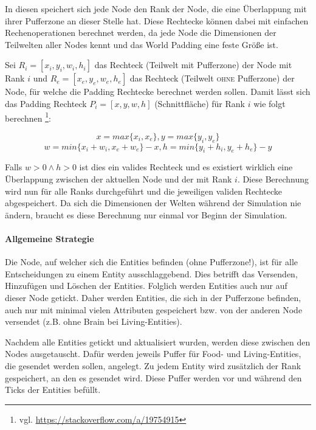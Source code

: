 \documentclass[course=erap]{aspdoc}
\begin{document}
In diesen speichert sich jede Node den Rank der Node, die eine Überlappung mit ihrer Pufferzone an dieser Stelle hat. Diese Rechtecke können dabei mit einfachen Rechenoperationen berechnet werden, da jede Node die Dimensionen der Teilwelten aller Nodes kennt und das World Padding eine feste Größe ist.

Sei \(R_i = [x_i, y_i, w_i, h_i]\) das Rechteck (Teilwelt mit Pufferzone) der Node mit Rank \(i\) und \(R_e = [x_e, y_e, w_e, h_e]\) das Rechteck (Teilwelt \textsc{ohne} Pufferzone) der Node, für welche die Padding Rechtecke berechnet werden sollen. Damit lässt sich das Padding Rechteck \(P_i = [x, y, w, h]\) (Schnittfläche) für Rank \(i\) wie folgt berechnen \footnote{vgl. \href{https://stackoverflow.com/a/19754915}{https://stackoverflow.com/a/19754915}}:

\[x = max\{x_i, x_e\}, y = max\{y_i, y_e\}\]
\[w = min\{x_i + w_i, x_e + w_e\} - x, h = min\{y_i + h_i, y_e + h_e\} - y\]

Falls \(w > 0 \land h > 0\) ist dies ein valides Rechteck und es existiert wirklich eine Überlappung zwischen der aktuellen Node und der mit Rank \(i\). Diese Berechnung wird nun für alle Ranks durchgeführt und die jeweiligen validen Rechtecke abgespeichert. Da sich die Dimensionen der Welten während der Simulation nie ändern, braucht es diese Berechnung nur einmal vor Beginn der Simulation.


\paragraph{Allgemeine Strategie}
\label{par:allgemeine-strategie}
Die Node, auf welcher sich die Entities befinden (ohne Pufferzone!), ist für alle Entscheidungen zu einem Entity ausschlaggebend. Dies betrifft das Versenden, Hinzufügen und Löschen der Entities. Folglich werden Entities auch nur auf dieser Node getickt. Daher werden Entities, die sich in der Pufferzone befinden, auch nur mit minimal vielen Attributen gespeichert bzw. von der anderen Node versendet (z.B. ohne Brain bei Living-Entities).

Nachdem alle Entities getickt und aktualisiert wurden, werden diese zwischen den Nodes ausgetauscht. Dafür werden jeweils Puffer für Food- und Living-Entities, die gesendet werden sollen, angelegt. Zu jedem Entity wird zusätzlich der Rank gespeichert, an den es gesendet wird. Diese Puffer werden vor und während den Ticks der Entities befüllt.
\end{document}
